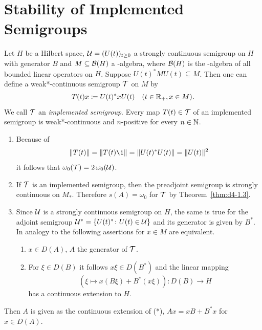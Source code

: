 \section{Stability of Implemented Semigroups}
Let $H$ be a Hilbert space, $\UG = (U(t))_{t \geq 0}$ a strongly continuous semigroup on $H$ with generator $B$ and $M \subseteq \mathcal{B}(H)$ a \WA-algebra, where $\mathcal{B}(H)$ is the \WA-algebra of all bounded linear operators on $H$.
Suppose $U(t)^{*}MU(t) \subseteq M$.
Then one can define a weak*-continuous semigroup $\mathcal{T}$ on $M$ by 
%
\[
	T(t)x \coloneqq U(t)^{*}xU(t) \quad (t \in \mathbb{R}_{+}, x \in M) .
\]
%
We call $\mathcal{T}$ an \emph{implemented semigroup}.
%
%
Every map $T(t) \in \mathcal{T}$ of an implemented semigroup is weak*-continuous and $n$-positive for every $n \in \mathbb{N}$.
\begin{remarks}\label{rem:d4-2.1}
\begin{enumerate}[\upshape (i), wide, labelindent=.25em]
\item\label{item:d4-2.1-i}
Because of
\[
	\|T(t)\| = \|T(t)\1\| = \|U(t)^{*}U(t)\| = \|U(t)\|^2
\]
it follows that $\omega_{0}(\mathcal{T}) = 2\,\omega_{0}(\mathcal{U})$.

\item\label{item:d4-2.1-ii}
If\/ $\mathcal{T}$ is an implemented semigroup, then the preadjoint semigroup is strongly continuous on $M_{*}$.
Therefore $s(A) = \omega_{0}$ for $\mathcal{T}$ by Theorem~\ref{thm:d4-1.3}.

\item\label{item:d4-2.1-iii}
Since $\mathcal{U}$ is a strongly continuous semigroup on $ H $, the same is true for the adjoint semigroup 
$\mathcal{U}^{*} = \{ U(t)^{*} \colon U(t) \in \mathcal{U} \}$ and its generator is given by $B^{*}$.
In analogy to \textcite[3.2.55]{brattelirobinson:1979} the following assertions for $x \in M$ are equivalent.
\begin{enumerate}[\upshape (a)]
\item
$x \in D(A)$, $ A $ the generator of\/ $ \mathcal{T} $.

\item
For $\xi \in D(B)$ it follows $x\xi \in D(B^{*})$ and the linear mapping
\begin{equation}
	(\xi \mapsto x(B\xi)+B^{*}(x\xi))\colon D(B) \to H \tag{*}
\end{equation}
has a continuous extension to $H$.
\end{enumerate}
\end{enumerate}
\end{remarks}
Then $A$ is given as the continuous extension of (*), \ie $Ax = xB + B^{*}x$ for $x \in D(A)$.

